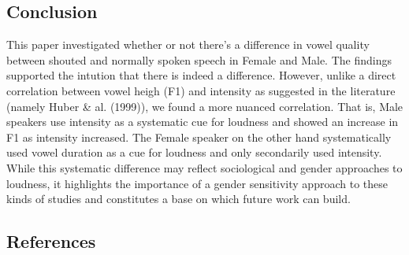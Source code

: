 \documentclass[floatsintext,man]{apa6}
\theoremstyle{definition}
\theoremstyle{definition}
\theoremstyle{definition}
\theoremstyle{remark}
\begin{document}
\subsection{Conclusion}\label{conclusion}

This paper investigated whether or not there's a difference in vowel
quality between shouted and normally spoken speech in Female and Male.
The findings supported the intution that there is indeed a difference.
However, unlike a direct correlation between vowel heigh (F1) and
intensity as suggested in the literature (namely Huber \& al. (1999)),
we found a more nuanced correlation. That is, Male speakers use
intensity as a systematic cue for loudness and showed an increase in F1
as intensity increased. The Female speaker on the other hand
systematically used vowel duration as a cue for loudness and only
secondarily used intensity. While this systematic difference may reflect
sociological and gender approaches to loudness, it highlights the
importance of a gender sensitivity approach to these kinds of studies
and constitutes a base on which future work can build.

\newpage

\subsection{References}\label{references}
\end{document}
